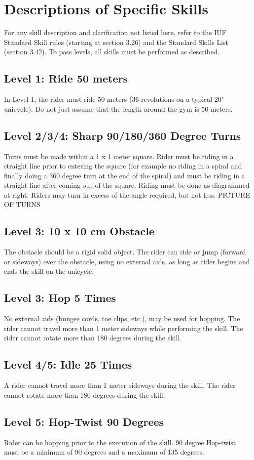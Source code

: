 \section{Descriptions of Specific Skills}
For any skill description and clarification not listed here, refer to the IUF Standard Skill rules (starting at section 3.26) and
the Standard Skills List (section 3.42). To pass levels, all skills must be performed as described.
\subsection{Level 1: Ride 50 meters}
In Level 1, the rider must ride 50 meters (36 revolutions on a typical 20" unicycle). Do not just assume that the length
around the gym is 50 meters.
\subsection{Level 2/3/4: Sharp 90/180/360 Degree Turns}
Turns must be made within a 1 x 1 meter square. Rider must be riding in a straight line prior to entering the square (for
example no riding in a spiral and finally doing a 360 degree turn at the end of the spiral) and must be riding in a straight line after coming out of the square. Riding must be done as diagrammed at right. Riders may turn in excess of the angle required, but not less.
PICTURE OF TURNS
\subsection{Level 3: 10 x 10 cm Obstacle}
The obstacle should be a rigid solid object. The rider can ride or jump (forward or sideways) over the obstacle, using
no external aids, as long as rider begins and ends the skill on the unicycle.
\subsection{Level 3: Hop 5 Times}
No external aids (bungee cords, toe clips, etc.), may be used for hopping. The rider cannot travel more than 1 meter
sideways while performing the skill. The rider cannot rotate more than 180 degrees during the skill.
\subsection{Level 4/5: Idle 25 Times}
A rider cannot travel more than 1 meter sideways during the skill. The rider cannot rotate more than 180 degrees
during the skill.
\subsection{Level 5: Hop-Twist 90 Degrees}
Rider can be hopping prior to the execution of the skill. 90 degree Hop-twist must be a minimum of 90 degrees and a
maximum of 135 degrees.
